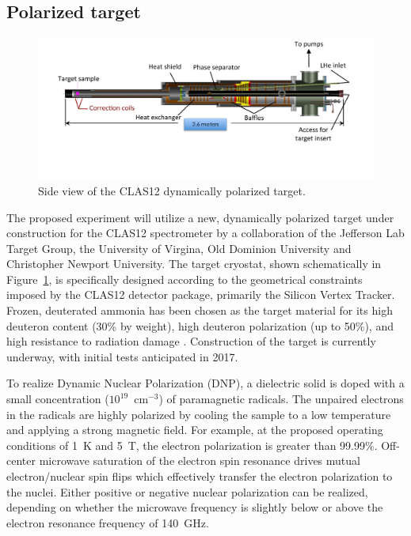 \subsection{Polarized target}\label{poltar-section}
\begin{figure}
\begin{center}
\includegraphics[width=5.5in]{Target_Side.pdf}
\end{center}
\caption{Side view of the CLAS12 dynamically polarized target.}
\label{Target}
\end{figure}
The proposed experiment will utilize a new, dynamically polarized target under construction for the CLAS12 spectrometer by a collaboration of the Jefferson Lab Target Group, the University of Virgina, Old Dominion University and Christopher Newport University.  The target cryostat, shown schematically in Figure~\ref{Target}, is specifically designed according to the geometrical constraints imposed by the CLAS12 detector package, primarily the Silicon Vertex Tracker.  Frozen, deuterated ammonia has been chosen as the target material for its high deuteron content (30\% by weight), high deuteron polarization (up to 50\%), and high resistance to radiation damage \cite{Goertz2002}.  Construction of the target is currently underway, with initial tests anticipated in 2017.

To realize Dynamic Nuclear Polarization (DNP), a dielectric solid is doped with a small concentration 
($10^{19}$~cm$^{\minus3}$) of paramagnetic radicals.  The unpaired electrons in the radicals are highly polarized by cooling the sample to a low temperature and applying a strong magnetic field.  For example, at the proposed operating conditions of 1~K and 5~T, the electron polarization is greater than 99.99\%.  Off-center microwave saturation of the electron spin resonance drives mutual electron/nuclear spin flips which effectively transfer the electron polarization to the nuclei.  Either positive or negative nuclear polarization can be realized, depending on whether the microwave frequency is slightly below or above the electron resonance frequency of 140~GHz.

